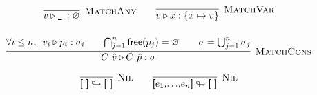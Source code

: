 \documentclass{article}
\def\code#1{\textsf{#1}}
\def\tsc#1{\textsc{#1}}
\def\matchj#1#2#3{#1 \triangleright #2 : #3}
\begin{document}
\begin{gather*}
\infer[\tsc{MatchAny}]{\matchj v {\texttt{\_}\,} \varnothing}{}\qquad
\infer[\tsc{MatchVar}]{\matchj v x {\{x\mapsto v\}}}{}\\[12pt]
\infer[\tsc{MatchCons}]{\matchj {C\ \hat{v}} {C\ \hat{p}} \sigma}{\forall i \leq n,\ \, \matchj{v_i}{p_i}{\sigma_i} && \bigcap_{j=1}^n \textsf{free}(p_j)=\varnothing && \sigma = \bigcup_{j=1}^n \sigma_j}	
\end{gather*}

\begin{gather*}
\infer[\tsc{Nil}]{\code{[ ]}\looparrowright \code{[ ]}}{}\qquad
\infer[\tsc{Nil}]{\code{[$e_1$,$\ldots$,$e_n$]}\looparrowright \code{[ ]}}{}
\end{gather*}
\end{document}
